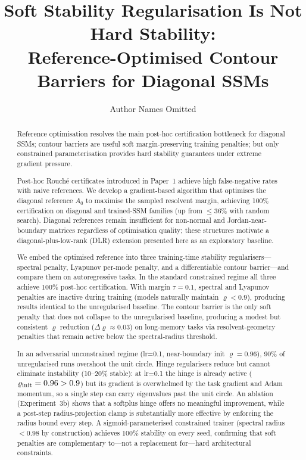 \documentclass{article}
\title{Soft Stability Regularisation Is Not Hard Stability:\\
Reference-Optimised Contour Barriers for Diagonal SSMs}
\author{Author Names Omitted}
\date{}
\theoremstyle{definition}
\begin{document}
\maketitle

\begin{abstract}
Reference optimisation resolves the main post-hoc certification
bottleneck for diagonal SSMs; contour barriers are useful soft
margin-preserving training penalties; but only constrained
parameterisation provides hard stability guarantees under extreme
gradient pressure.

Post-hoc Rouch\'e certificates introduced in Paper~1 achieve high
false-negative rates with naive references.  We develop a gradient-based
algorithm that optimises the diagonal reference $A_0$ to maximise the
sampled resolvent margin, achieving 100\% certification on diagonal and
trained-SSM families (up from $\leq 36\%$ with random search).  Diagonal
references remain insufficient for non-normal and Jordan-near-boundary
matrices regardless of optimisation quality; these structures motivate a
diagonal-plus-low-rank (DLR) extension presented here as an exploratory
baseline.

We embed the optimised reference into three training-time stability
regularisers---spectral penalty, Lyapunov per-mode penalty, and a
differentiable contour barrier---and compare them on autoregressive tasks.
In the standard constrained regime all three achieve 100\% post-hoc
certification.  With margin $\tau=0.1$, spectral and Lyapunov penalties
are inactive during training (models naturally maintain $\varrho<0.9$),
producing results identical to the unregularised baseline.  The contour
barrier is the only soft penalty that does not collapse to the unregularised
baseline, producing a modest but consistent $\varrho$ reduction ($\Delta\varrho
\approx 0.03$) on long-memory tasks via resolvent-geometry penalties that
remain active below the spectral-radius threshold.

In an adversarial unconstrained regime (lr=0.1, near-boundary init
$\varrho=0.96$), 90\% of unregularised runs overshoot the unit circle.
Hinge regularisers reduce but cannot eliminate instability (10--20\%
stable): at lr=0.1 the hinge is already active ($\varrho_{\rm init}=0.96>0.9$)
but its gradient is overwhelmed by the task gradient and Adam momentum,
so a single step can carry eigenvalues past the unit circle.  An ablation
(Experiment~3b) shows that a softplus hinge offers no meaningful improvement,
while a post-step radius-projection clamp is substantially more effective by
enforcing the radius bound every step.  A sigmoid-parameterised
constrained trainer (spectral radius $< 0.98$ by construction) achieves
100\% stability on every seed, confirming that soft penalties are
complementary to---not a replacement for---hard architectural constraints.
\end{abstract}
\end{document}
